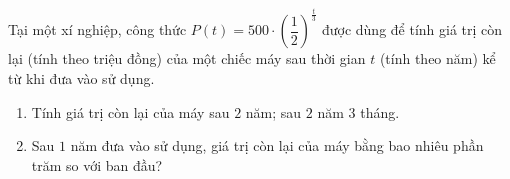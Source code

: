 \begin{bt}
	Tại một xí nghiệp, công thức $P(t)=500 \cdot\left(\dfrac{1}{2}\right)^{\tfrac{t}{3}}$ được dùng để tính giá trị còn lại (tính theo triệu đồng) của một chiếc máy sau thời gian $t$ (tính theo năm) kể từ khi đưa vào sử dụng.
	\begin{enumerate}
		\item Tính giá trị còn lại của máy sau $2$ năm; sau $2$ năm $3$ tháng.
		\item Sau $1$ năm đưa vào sử dụng, giá trị còn lại của máy bằng bao nhiêu phần trăm so với ban đầu?
	\end{enumerate}
\end{bt}
